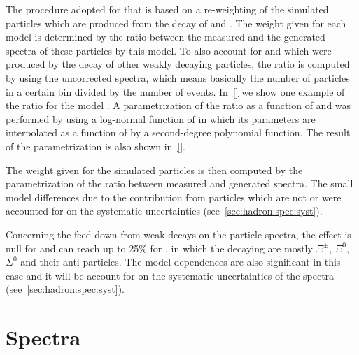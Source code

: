 The procedure adopted for that is based on a re-weighting
of the simulated particles which are produced from
the decay of \lambs and \kzeros. The weight given for
each model is determined by the ratio between the
measured and the generated spectra of these particles
by this model. To also account for \lambs and \kzeros
which were produced by the decay of other weakly decaying
particles, the ratio is computed by using the uncorrected
spectra, which means basically the number of particles
in a certain bin divided by the number of events. 
In~\cref{} we show one example of the ratio
for the model \EposLong. 
A parametrization of the ratio as a function of \pp and \pT
was performed by using a log-normal function of \pp
in which its parameters are interpolated as a function of \pT
by a second-degree polynomial function. The result of the parametrization
is also shown in~\cref{}.



The weight given for the simulated particles is then
computed by the parametrization of the ratio between
measured and generated spectra. The small model differences
due to the contribution from particles which
are not \lambs or \kzeros were accounted for on the systematic
uncertainties (see~\cref{sec:hadron:spec:syst}).

Concerning the feed-down from weak decays on the \vzero particle
spectra, the effect is null for \kzeros and can reach up to 25\%
for \lambs, in which the decaying are mostly $\Xi^{\pm}$, $\Xi^0$,
$\Sigma^0$ and their anti-particles. The model dependences are also
significant in this case and it will be account for
on the systematic uncertainties of the spectra (see~\cref{sec:hadron:spec:syst}).


\section{Spectra}
\label{sec:hadron:spec}


